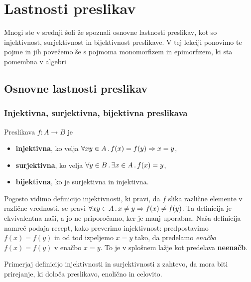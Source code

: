 \chapter{Lastnosti preslikav}
\label{cha:lastnosti-preslikav}

Mnogi ste v srednji šoli že spoznali osnovne lastnosti preslikav, kot so injektivnost, surjektivnost in bijektivnost preslikave. V tej lekciji ponovimo te pojme in jih povežemo še s pojmoma monomorfizem in epimorfizem, ki sta pomembna v algebri

\section{Osnovne lastnosti preslikav}

\subsection{Injektivna, surjektivna, bijektivna preslikava}

\begin{definicija}
  Preslikava $f : A \to B$ je
  \begin{itemize}
  \item \textbf{injektivna}, ko velja $\forall x y \in A \,.\, f(x) = f(y) \Rightarrow x = y$,
  \item \textbf{surjektivna}, ko velja $\forall y \in B \,.\, \exists x \in A \,.\, f(x) = y$,
  \item \textbf{bijektivna}, ko je surjektivna in injektivna.
  \end{itemize}
\end{definicija}

\begin{opomba}
  Pogosto vidimo definicijo injektivnosti, ki pravi, da $f$ slika različne elemente v različne vrednosti, se pravi $\forall x y \in A \,.\, x \neq y \Rightarrow f(x) \neq f(y)$. Ta definicija je ekvivalentna naši, a jo ne priporočamo, ker je manj uporabna.
  Naša definicija namreč podaja recept, kako preverimo injektivnost: predpostavimo $f(x) = f(y)$ in od tod izpeljemo
  $x = y$ tako, da predelamo \emph{enačbo} $f(x) = f(y)$ v enačbo $x = y$. To je v splošnem lažje kot predelava \textbf{neenačb}.
\end{opomba}

\begin{vaja}
  Primerjaj definicijo injektivnosti in surjektivnosti z zahtevo, da mora biti prirejanje, ki določa preslikavo, enolično in celovito.
\end{vaja}


